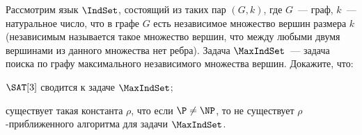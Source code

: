 Рассмотрим язык $\IndSet$, состоящий из таких пар $(G, k)$, где $G$~--- граф, $k$~--- натуральное число,
что в графе $G$ есть независимое множество вершин размера $k$ (независимым называется такое множество
вершин, что между любыми двумя вершинами из данного множества нет ребра). Задача $\MaxIndSet$~--- задача
поиска по графу максимального независимого множества вершин. Докажите, что:
\begin{enumcyr}
    \item $\SAT[3]$ сводится к задаче $\MaxIndSet$;
    \item существует такая константа $\rho$, что если $\P \neq \NP$, то не существует
        $\rho$-приближенного алгоритма для задачи $\MaxIndSet$.
\end{enumcyr}
